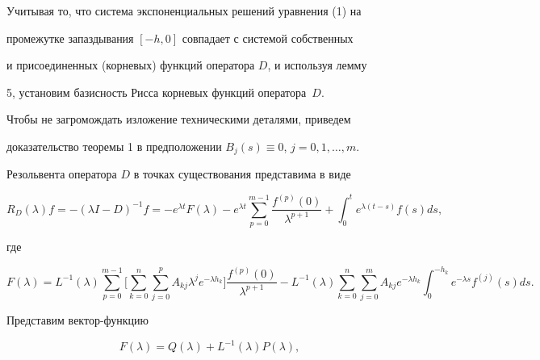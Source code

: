 Учитывая то, что система экспоненциальных решений уравнения (1) на


промежутке запаздывания $[-h,0]$ совпадает с системой собственных


и присоединенных (корневых) функций оператора $D$, и используя лемму


5, установим базисность Рисса корневых функций оператора~$D$.





Чтобы не загромождать изложение техническими деталями, приведем


доказательство теоремы 1 в предположении $B_j(s)\equiv


0$, $j=0,1,\dotsc,m$.





Резольвента оператора $D$ в точках существования представима в виде


\begin{equation}


\label{f}


R_D(\lambda)f=-(\lambda I-D)^{-1}f=-e^{\lambda t}F(\lambda)-


e^{\lambda t}\sum\limits_{p=0}^{m-1}\frac{f^{(p)}(0)}{\lambda^{p+1}}+


\int_0^te^{\lambda (t-s)}f(s)ds,


\end{equation}


где


$$


F(\lambda)=L^{-1}(\lambda)\sum\limits_{p=0}^{m-1}\bigg[


\sum\limits_{k=0}^n\sum\limits_{j=0}^pA_{kj}\lambda^je^{-\lambda h_k}\bigg]


\frac{f^{(p)}(0)}{\lambda^{p+1}}- 


L^{-1}(\lambda)\sum\limits_{k=0}^n \sum\limits_{j=0}^m A_{kj}e^{-\lambda h_k}


\int_0^{-h_k}e^{-\lambda s}f^{(j)}(s)ds.


$$





Представим вектор-функцию


\begin{equation}


\label{g}


F(\lambda)=Q(\lambda)+L^{-1}(\lambda)P(\lambda),


\end{equation}


